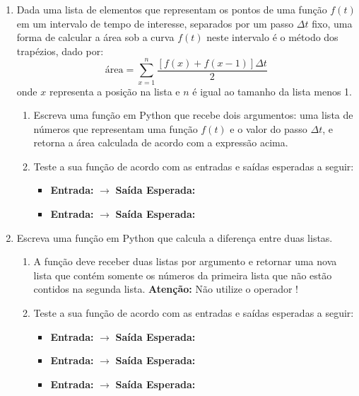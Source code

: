 \begin{enumerate}[label=\textbf{Q\arabic*.}]
    \item Dada uma lista de elementos que representam os pontos de uma função $f(t)$ em um intervalo de tempo de interesse, separados por um passo $\Delta t$ fixo, uma forma de calcular a área sob a curva $f(t)$ neste intervalo é o método dos trapézios, dado por:
    \[
    \text{área} = \sum_{x=1}^{n} \frac{[f(x) + f(x-1)] \Delta t}{2}
    \]
    onde $x$ representa a posição na lista e $n$ é igual ao tamanho da lista menos 1.
    \begin{enumerate}[label=\alph*)]
        \item Escreva uma função em Python que recebe dois argumentos: uma lista de números que representam uma função $f(t)$ e o valor do passo $\Delta t$, e retorna a área calculada de acordo com a expressão acima.
        \item Teste a sua função de acordo com as entradas e saídas esperadas a seguir:
        \begin{itemize}
            \item \textbf{Entrada:}  $\rightarrow$ \textbf{Saída Esperada:} 
            \item \textbf{Entrada:}  $\rightarrow$ \textbf{Saída Esperada:} 
        \end{itemize}
    \end{enumerate}

    \vspace{0.5cm}
    

    \item Escreva uma função em Python que calcula a diferença entre duas listas.
    \begin{enumerate}[label=\alph*)]
        \item A função deve receber duas listas por argumento e retornar uma nova lista que contém somente os números da primeira lista que não estão contidos na segunda lista. \textbf{Atenção:} Não utilize o operador !
        \item Teste a sua função de acordo com as entradas e saídas esperadas a seguir:
        \begin{itemize}
            \item \textbf{Entrada:}  $\rightarrow$ \textbf{Saída Esperada:} \code{[1, 3, 5]}
            \item \textbf{Entrada:}  $\rightarrow$ \textbf{Saída Esperada:} \code{[]}
            \item \textbf{Entrada:}  $\rightarrow$ \textbf{Saída Esperada:} \code{[1, 2, 3]}
        \end{itemize}
    \end{enumerate}
    





\end{enumerate}
